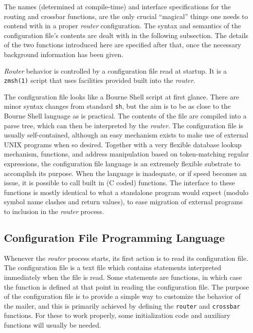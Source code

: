 

The names (determined at compile-time) and interface specifications for the
routing and crossbar functions, are the only crucial ``magical'' things one
needs to contend with in a proper {\em router} configuration.  The syntax and
semantics of the configuration file's contents are dealt with in the
following subsection. The details of the two functions introduced here are
specified after that, once the necessary background information has been
given.

{\em Router} behavior is controlled by a configuration file read at 
startup. It is a {\tt zmsh(1)} script that uses facilities provided 
built into the {\em router}. 

The configuration file looks like a Bourne Shell script at first glance.
There are minor syntax changes from standard {\tt sh}, but the aim is to be as
close to the Bourne Shell language as is practical. The contents of the
file are compiled into a parse tree, which can then be interpreted by the
{\em router}.  The configuration file is usually self-contained, although an easy
mechanism exists to make use of external UNIX programs when so desired.
Together with a very flexible database lookup mechanism, functions, and
address manipulation based on token-matching regular expressions, the
configuration file language is an extremely flexible substrate to
accomplish its purpose. When the language is inadequate, or if speed
becomes an issue, it is possible to call built in (C coded) functions. The
interface to these functions is mostly identical to what a standalone
program would expect (modulo symbol name clashes and return values), to
ease migration of external programs to inclusion in the {\em router} process.




\subsection{Configuration File Programming Language}



Whenever the {\em router} process starts, its first action is to read its
configuration file.  The configuration file is a text file which contains
statements interpreted immediately when the file is read.  Some statements
are functions, in which case the function is defined at that point in
reading the configuration file.  The purpose of the configuration file is
to provide a simple way to customize the behavior of the mailer, and this
is primarily achieved by defining the {\tt router} and {\tt crossbar} 
functions. For these to work properly, some initialization code and auxiliary
functions will usually be needed.

